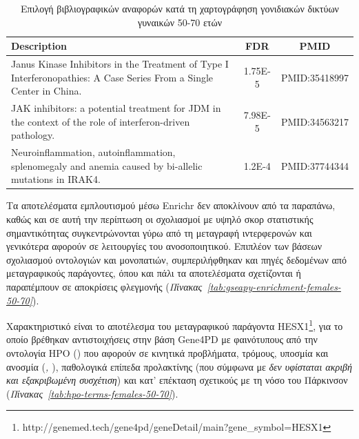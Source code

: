 \documentclass[12pt]{report}
\renewcommand{\arraystretch}{1.5}
\let\oldfootnote\footnote
\renewcommand{\footnote}[1]{\oldfootnote{\onehalfspacing #1}}
\begin{document}
            \begin{table}[H]
                \centering
                \scriptsize
                \setlength{\tabcolsep}{4pt}
                \renewcommand{\arraystretch}{1.1}
                \begin{tabular}{@{}>{\raggedright}p{10cm}S[table-format=1.2E-2]c@{}}
                    \toprule
                    \textbf{Description} & \textbf{FDR} & \textbf{PMID} \\
                    \midrule
                     Janus Kinase Inhibitors in the Treatment of Type I Interferonopathies: A Case Series From a Single Center in China. & 1.75E-5 & PMID:35418997 \\
                      JAK inhibitors: a potential treatment for JDM in the context of the role of interferon-driven pathology. & 7.98E-5 & PMID:34563217 \\
                      Neuroinflammation, autoinflammation, splenomegaly and anemia caused by bi-allelic mutations in IRAK4. & 1.2E-4 & PMID:37744344 \\
                    \bottomrule
                \end{tabular}
                \caption{Επιλογή βιβλιογραφικών αναφορών κατά τη χαρτογράφηση γονιδιακών δικτύων γυναικών 50-70 ετών}
                \label{tab:cyto-pub-enrichment-females-50-70}
            \end{table}
            \newpage
                Τα αποτελέσματα εμπλουτισμού μέσω Enrichr δεν αποκλίνουν από τα παραπάνω, καθώς και σε αυτή την περίπτωση οι σχολιασμοί με υψηλό σκορ στατιστικής σημαντικότητας συγκεντρώνονται γύρω από τη μεταγραφή ιντερφερονών και γενικότερα αφορούν σε λειτουργίες του ανοσοποιητικού. Επιπλέον των βάσεων σχολιασμού οντολογιών και μονοπατιών, συμπεριλήφθηκαν και πηγές δεδομένων από μεταγραφικούς παράγοντες, όπου και πάλι τα αποτελέσματα σχετίζονται ή παραπέμπουν σε αποκρίσεις φλεγμονής (\emph{Πίνακας~\ref{tab:gseapy-enrichment-females-50-70}}). 
            \par
                Χαρακτηριστικό είναι το αποτέλεσμα του μεταγραφικού παράγοντα HESX1\footnote{http://genemed.tech/gene4pd/geneDetail/main?gene\_symbol=HESX1}, για το οποίο βρέθηκαν αντιστοιχήσεις στην βάση Gene4PD με φαινότυπους από την οντολογία HPO (\emph{\cite{Gargano2024TheWorld}}) που αφορούν σε κινητικά προβλήματα, τρόμους, υποσμία και ανοσμία (\emph{\cite{Mitchell2025HyposmiaLoss.}, \cite{Tarakad2017AnosmiaDisease}}), παθολογικά επίπεδα προλακτίνης (που σύμφωνα με \emph{\cite{Al-kuraishy2023TheWays} δεν υφίσταται ακριβή και εξακριβωμένη συσχέτιση}) και κατ' επέκταση σχετικούς με τη νόσο του Πάρκινσον (\emph{Πίνακας~\ref{tab:hpo-terms-females-50-70}}).
\end{document}
